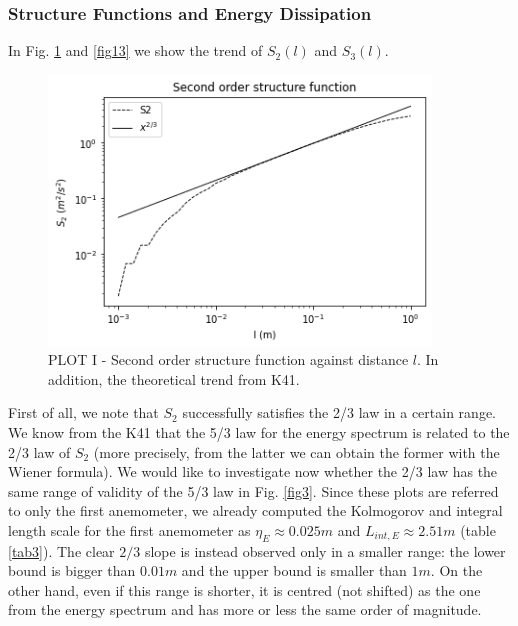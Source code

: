 \documentclass[11pt,titlepage]{article}
\begin{document}
\subsubsection{Structure Functions and Energy Dissipation}
In Fig. \ref{fig12} and  \ref{fig13} we show the trend of $S_2(l)$ and $S_3(l)$.  
\begin{center}
	\begin{figure} [h]
		\centering
		\includegraphics[width = 4in]{./figures/ex1_7_1.png}
		\caption{PLOT I - Second order structure function against distance $l$. In addition, the theoretical trend from K41.}
		\label{fig12}
	\end{figure}
\end{center}
First of all, we note that $S_2$ successfully satisfies the 2/3 law in a certain range. We know from the K41 that the 5/3 law for the energy spectrum is related to the 2/3 law of $S_2$ (more precisely, from the latter we can obtain the former with the Wiener formula). We would like to investigate now whether the 2/3 law has the same range of validity of the 5/3 law in Fig. \ref{fig3}. Since these plots are referred to only the first anemometer, we already computed the Kolmogorov and integral length scale for the first anemometer as $\eta_E \approx 0.025m$ and $L_{int,E} \approx 2.51m$ (table \ref{tab3}). The clear $2/3$ slope is instead observed only in a smaller range: the lower bound is bigger than $0.01m$ and the upper bound is smaller than $1m$. On the other hand, even if this range is shorter, it is centred (not shifted) as the one from the energy spectrum and has more or less the same order of magnitude. \\
\end{document}
